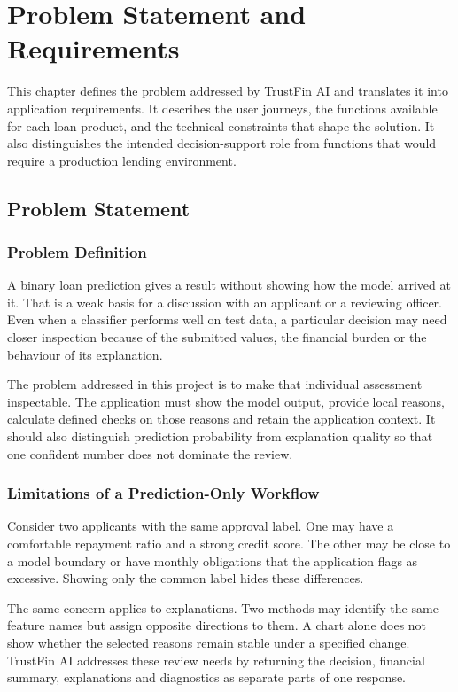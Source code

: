 \chapter[PROBLEM STATEMENT AND REQUIREMENTS]{Problem Statement and Requirements}

This chapter defines the problem addressed by TrustFin AI and translates it into application requirements. It describes the user journeys, the functions available for each loan product, and the technical constraints that shape the solution. It also distinguishes the intended decision-support role from functions that would require a production lending environment.

\section{Problem Statement}
\subsection{Problem Definition}
A binary loan prediction gives a result without showing how the model arrived at it. That is a weak basis for a discussion with an applicant or a reviewing officer. Even when a classifier performs well on test data, a particular decision may need closer inspection because of the submitted values, the financial burden or the behaviour of its explanation.

The problem addressed in this project is to make that individual assessment inspectable. The application must show the model output, provide local reasons, calculate defined checks on those reasons and retain the application context. It should also distinguish prediction probability from explanation quality so that one confident number does not dominate the review.

\subsection{Limitations of a Prediction-Only Workflow}
Consider two applicants with the same approval label. One may have a comfortable repayment ratio and a strong credit score. The other may be close to a model boundary or have monthly obligations that the application flags as excessive. Showing only the common label hides these differences.

The same concern applies to explanations. Two methods may identify the same feature names but assign opposite directions to them. A chart alone does not show whether the selected reasons remain stable under a specified change. TrustFin AI addresses these review needs by returning the decision, financial summary, explanations and diagnostics as separate parts of one response.

